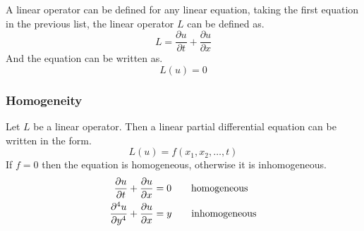 A linear operator can be defined for any linear equation, taking the first equation in the previous list, the linear operator $L$ can be defined as.
\[
L = \frac{\partial u }{\partial t} + \frac{\partial u}{\partial x}
\]
And the equation can be written as.
\[
    L(u)=0    
\]

\subsubsection{Homogeneity}
Let $L$ be a linear operator. Then a linear partial differential equation can be written in the form.
\[
    L(u) = f(x_1,x_2, \dots , t)    
\]
If $f = 0$ then the equation is homogeneous, otherwise it is inhomogeneous.
\begin{align*}
\frac{\partial u}{\partial t} + \frac{\partial u}{\partial x} &= 0 \quad\quad \text{homogeneous}
\\
\frac{\partial^4 u}{\partial y^4} + \frac{\partial u}{\partial x} &= y \quad\quad \text{inhomogeneous}
\end{align*}

\newpage

